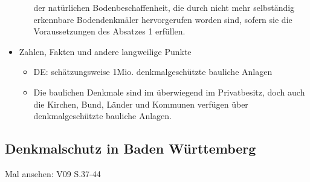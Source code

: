 \documentclass[fleqn,twoside,dvipsnames]{article}
\begin{document}
\begin{itemize}
\begin{itemize}
                                                der natürlichen Bodenbeschaffenheit, die durch nicht mehr selbständig erkennbare
                                                Bodendenkmäler hervorgerufen worden sind, sofern sie die Voraussetzungen des Absatzes 1
                                                erfüllen.
                \end{itemize}
            \item Zahlen, Fakten und andere langweilige Punkte
                \begin{itemize}
                    \item DE: schätzungsweise 1Mio. denkmalgeschützte bauliche Anlagen
                    \item Die baulichen Denkmale sind im überwiegend im Privatbesitz, doch auch
                            die Kirchen, Bund, Länder und Kommunen verfügen über
                            denkmalgeschützte bauliche Anlagen.
                \end{itemize}
        \end{itemize}

    \subsection{Denkmalschutz in Baden Württemberg}
        Mal ansehen: V09 S.37-44
        
\end{document}
